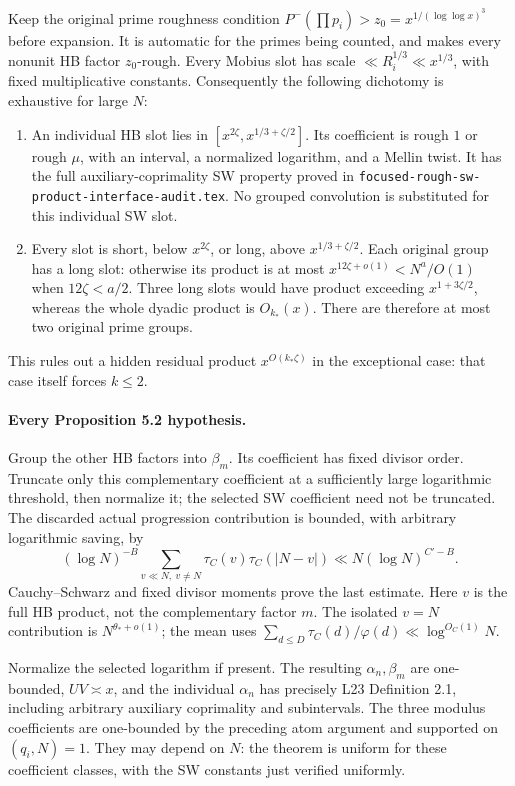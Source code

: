 Keep the original prime roughness condition
$P^-(\prod p_i)>z_0=x^{1/(\log\log x)^3}$ before expansion. It is
automatic for the primes being counted, and makes every nonunit
HB factor $z_0$-rough. Every Mobius slot has scale
$\ll R_i^{1/3}\ll x^{1/3}$, with fixed multiplicative constants.
Consequently the following dichotomy is exhaustive for large $N$:
\begin{enumerate}
\item An individual HB slot lies in
$[x^{2\zeta},x^{1/3+\zeta/2}]$. Its coefficient is rough $1$ or
rough $\mu$, with an interval, a normalized logarithm, and a Mellin
twist. It has the full auxiliary-coprimality SW property proved in
\texttt{focused-rough-sw-product-interface-audit.tex}. No grouped
convolution is substituted for this individual SW slot.
\item Every slot is short, below $x^{2\zeta}$, or long, above
$x^{1/3+\zeta/2}$. Each original group has a long slot: otherwise
its product is at most $x^{12\zeta+o(1)}<N^a/O(1)$ when
$12\zeta<a/2$. Three long slots would have product exceeding
$x^{1+3\zeta/2}$, whereas the whole dyadic product is $O_{k_*}(x)$.
There are therefore at most two original prime groups.
\end{enumerate}
This rules out a hidden residual product $x^{O(k_*\zeta)}$ in the
exceptional case: that case itself forces $k\le2$.

\paragraph{Every Proposition 5.2 hypothesis.}
Group the other HB factors into $\beta_m$. Its coefficient has fixed
divisor order. Truncate only this complementary coefficient at a
sufficiently large logarithmic threshold, then normalize it; the
selected SW coefficient need not be truncated. The discarded actual
progression contribution is bounded, with arbitrary logarithmic
saving, by
\[
 (\log N)^{-B}\sum_{v\ll N,\ v\ne N}
       \tau_C(v)\tau_C(|N-v|)\ll N(\log N)^{C'-B}.
\]
Cauchy--Schwarz and fixed divisor moments prove the last estimate.
Here $v$ is the full HB product, not the complementary factor $m$.
The isolated $v=N$ contribution is $N^{\theta_*+o(1)}$; the mean
uses $\sum_{d\le D}\tau_C(d)/\varphi(d)\ll\log^{O_C(1)}N$.

Normalize the selected logarithm if present. The resulting
$\alpha_n,\beta_m$ are one-bounded, $UV\asymp x$, and the individual
$\alpha_n$ has precisely L23 Definition 2.1, including arbitrary
auxiliary coprimality and subintervals. The three modulus coefficients
are one-bounded by the preceding atom argument and supported on
$(q_i,N)=1$. They may depend on $N$: the theorem is uniform for
these coefficient classes, with the SW constants just verified
uniformly.

